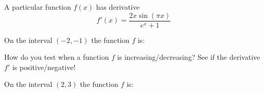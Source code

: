 \documentclass{ximera}
\begin{document}
\begin{exercise}
	
	A particular function $f(x)$ has derivative
	\[ f'(x) = \frac{2x\sin(\pi x)}{e^x+1}\]

	On the interval $(-2, -1)$ the function $f$ is: 
	\begin{hint}
		How do you test when a function $f$ is increasing/decreasing?  See if the derivative $f'$ is positive/negative!
	\end{hint}
	\begin{exercise}
		On the interval $(2,3)$ the function $f$ is:
	\end{exercise}
\end{exercise}
\end{document}
